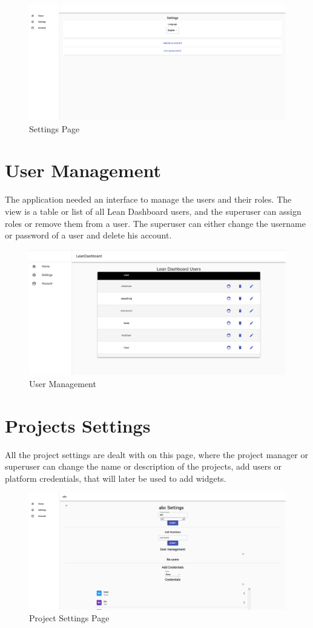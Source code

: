 \documentclass[a4paper,twoside,10pt]{report}
\begin{document}
\begin{figure}[h!]
\center
  \includegraphics[width=\textwidth]{settingsPage.png}
\caption{Settings Page}
\end{figure}
\section{User Management}
The application needed an interface to manage the users and their roles. The view is a table or list of all Lean Dashboard users, and the superuser can assign roles or remove them from a user. The superuser can either change the username or password of a user and delete his account.
\begin{figure}[h!]
\center
  \includegraphics[width=\textwidth]{UserManagement.png}
\caption{User Management}
\end{figure}
\section{Projects Settings}
All the project settings are dealt with on this page, where the project manager or superuser can change the name or description of the projects, add users or platform credentials, that will later be used to add widgets.

\begin{figure}[h!]
\center
  \includegraphics[width=\textwidth]{projectsettingsPage.png}
\caption{Project Settings Page}
\end{figure}
\end{document}
